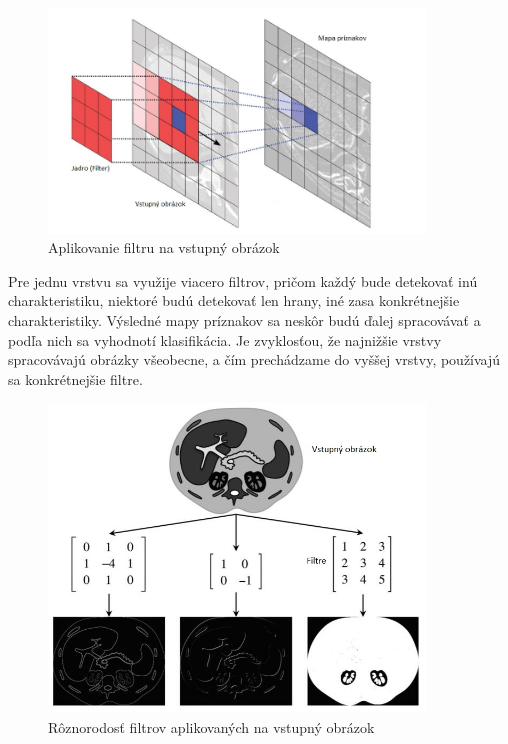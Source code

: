 \begin{figure}[h]
\begin{centering}
\includegraphics[width=10cm]{assets/images/223_1.JPG}
\par\end{centering}
\caption{Aplikovanie filtru na vstupný obrázok \label{fig:dynabook}\cite{Deep-Learning-A-Primer-for-Radiologists}}
\end{figure}

\hspace{10mm}Pre jednu vrstvu sa využije viacero filtrov, pričom každý bude detekovať inú charakteristiku, niektoré budú detekovať len hrany, iné zasa konkrétnejšie charakteristiky. Výsledné mapy príznakov sa neskôr budú ďalej spracovávať a podľa nich sa vyhodnotí klasifikácia. Je zvyklosťou, že najnižšie vrstvy spracovávajú obrázky všeobecne, a čím prechádzame do vyššej vrstvy, používajú sa konkrétnejšie filtre.\cite{Goodfellow-et-al-2016, Deep-Learning-A-Primer-for-Radiologists}


\begin{figure}[h]
\begin{centering}
\includegraphics[width=10cm]{assets/images/223_2.JPG}
\par\end{centering}
\caption{Rôznorodosť filtrov aplikovaných na vstupný obrázok \label{fig:dynabook}\cite{Deep-Learning-A-Primer-for-Radiologists}}
\end{figure}

